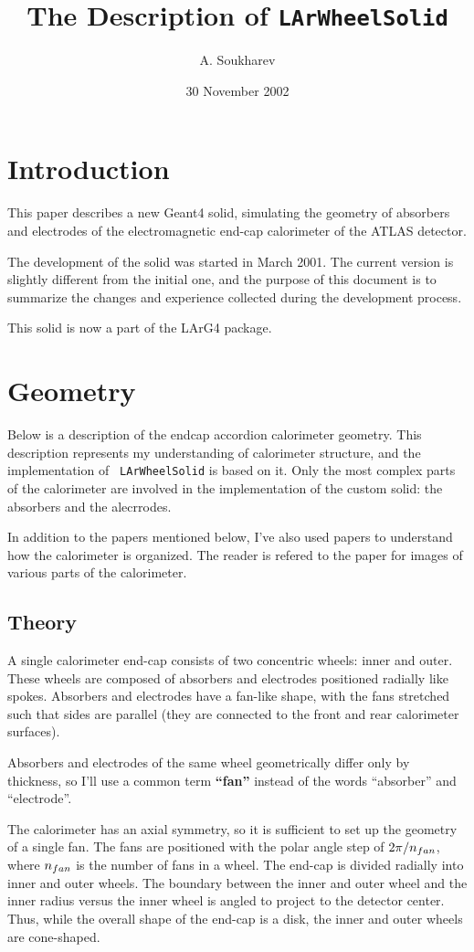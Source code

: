 \documentclass{article}
\author{A. Soukharev}
\title{The Description of {\tt LArWheelSolid}}
\date{30 November 2002}
\begin{document}
\maketitle
\section{Introduction}
This paper describes a new Geant4\cite{G4}
solid, 
simulating the geometry of absorbers and electrodes of the electromagnetic
end-cap ca\-lo\-ri\-me\-ter\cite{EMEC} of the ATLAS detector.

The development of the solid was started in March 2001. The current version is
slightly different from the initial one, and the purpose of this document is to
summarize the changes and experience collected during the development process.

This solid is now a part of the LArG4 package.

\section{Geometry}
Below is a description of the endcap accordion calorimeter geometry.
This description represents my
understanding of calorimeter structure, and the implementation of {\tt
LArWheelSolid} is based on it. 
Only the most complex parts of the calorimeter are involved in the
implementation of the custom solid:
the absorbers and the alecrrodes.

In addition to the papers mentioned below, 
I've also used papers
\cite{r1, r2, r3} to understand how the calorimeter is organized.
The reader is refered to the paper \cite{EMEC} for images of various parts of
the calorimeter.

\subsection{Theory}
A single calorimeter end-cap consists of two concentric wheels: inner and
outer. These wheels are composed of absorbers and electrodes positioned radially
like spokes. Absorbers and electrodes have a fan-like shape, with the fans 
stretched such that sides are parallel (they are connected to the front and
rear calorimeter surfaces).

Absorbers and electrodes of the same wheel geometrically differ 
only by thickness, so I'll use a common term {\bf ``\/fan''} instead
of the words ``absorber'' and ``electrode''.

The calorimeter has an axial symmetry, so it is sufficient to set up 
the geometry of a
single fan. The fans are positioned with the polar angle step of $2\pi /
n_{fan}\/$, where $n_{fan}\/$ is the number of fans in a wheel.
The end-cap is divided radially into inner and outer wheels. The boundary between
the inner and outer wheel and the inner radius versus the inner wheel is angled to
project to the detector center. Thus, while the overall shape of the
end-cap is a
disk, the inner and outer wheels are cone-shaped.
\end{document}
